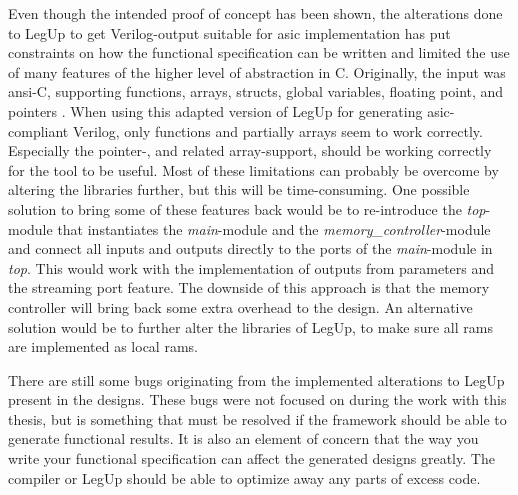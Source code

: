 Even though the intended proof of concept has been shown, the alterations done to LegUp to get Verilog-output suitable for \gls{asic} implementation has put constraints on how the functional specification can be written and limited the use of many features of the higher level of abstraction in C. Originally, the input was \gls{ansi}-C, supporting functions, arrays, structs, global variables, floating point, and pointers \cite{legupfaq}. When using this adapted version of LegUp for generating \gls{asic}-compliant Verilog, only functions and partially arrays seem to work correctly. Especially the pointer-, and related array-support, should be working correctly for the tool to be useful. Most of these limitations can probably be overcome by altering the libraries further, but this will be time-consuming. One possible solution to bring some of these features back would be to re-introduce the \textit{top}-module that instantiates the \textit{main}-module and the \textit{memory\_controller}-module and connect all inputs and outputs directly to the ports of the \textit{main}-module in \textit{top}. This would work with the implementation of outputs from parameters and the streaming port feature. The downside of this approach is that the memory controller will bring back some extra overhead to the design. An alternative solution would be to further alter the libraries of LegUp, to make sure all \gls{ram}s are implemented as local \gls{ram}s. 

There are still some bugs originating from the implemented alterations to LegUp present in the designs. These bugs were not focused on during the work with this thesis, but is something that must be resolved if the framework should be able to generate functional results. It is also an element of concern that the way you write your functional specification can affect the generated designs greatly. The compiler or LegUp should be able to optimize away any parts of excess code.
